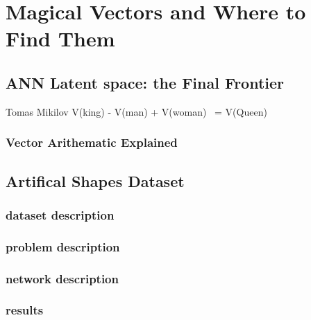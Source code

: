 
\chapter{Magical Vectors and Where to Find Them} %

\label{Chapter5} %


\section{ANN Latent space: the Final Frontier}
Tomas Mikilov V(king) - V(man) + V(woman) ~= V(Queen)
\subsection{Vector Arithematic Explained}

\section{Artifical Shapes Dataset}
\subsection{dataset description}
\subsection{problem description}
\subsection{network description}
\subsection{results}


